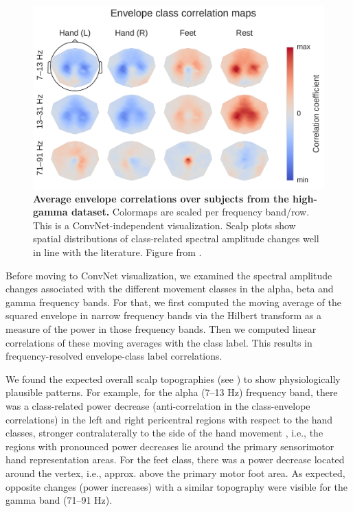 \begin{figure}[htb]
    \myfloatalign
    \includegraphics[width=1\linewidth]{images/Envelope_Correlations.ipynb.1.pdf-1.png}
    
    \caption[Envelope correlations on high-gamma dataset]{
\textbf{Average envelope correlations over subjects from the high-gamma dataset.} Colormaps are scaled per frequency band/row. This is a ConvNet-independent
visualization. Scalp plots show spatial distributions of class-related
spectral amplitude changes well in line with the literature. Figure from
\citet{schirrmeisterdeephbm2017}.
}
\label{envelope-class-fig}
\end{figure}


    Before moving to ConvNet visualization, we examined the spectral
amplitude changes associated with the different movement classes in the
alpha, beta and gamma frequency bands. For that, we first computed the
moving average of the squared envelope in narrow frequency bands via the
Hilbert transform as a measure of the power in those frequency bands.
Then we computed linear correlations of these moving averages with the
class label. This results in frequency-resolved envelope-class label
correlations.

We found the expected overall scalp topographies (see
) to show physiologically plausible
patterns. For example, for the alpha (7--13 Hz) frequency band, there
was a class-related power decrease (anti-correlation in the
class-envelope correlations) in the left and right pericentral regions
with respect to the hand classes, stronger contralaterally to the side
of the hand movement , i.e., the regions with pronounced power decreases
lie around the primary sensorimotor hand representation areas. For the
feet class, there was a power decrease located around the vertex, i.e.,
approx. above the primary motor foot area. As expected, opposite changes
(power increases) with a similar topography were visible for the gamma
band (71--91 Hz).

